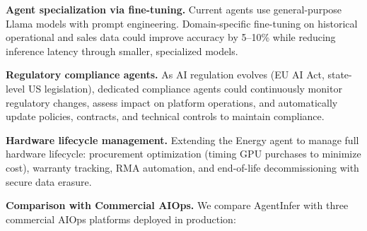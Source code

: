 \documentclass[conference,10pt,letterpaper]{IEEEtran}
\begin{document}
\textbf{Agent specialization via fine-tuning.} Current agents use general-purpose Llama models with prompt engineering. Domain-specific fine-tuning on historical operational and sales data could improve accuracy by 5--10\% while reducing inference latency through smaller, specialized models.

\textbf{Regulatory compliance agents.} As AI regulation evolves (EU AI Act, state-level US legislation), dedicated compliance agents could continuously monitor regulatory changes, assess impact on platform operations, and automatically update policies, contracts, and technical controls to maintain compliance.

\textbf{Hardware lifecycle management.} Extending the Energy agent to manage full hardware lifecycle: procurement optimization (timing GPU purchases to minimize cost), warranty tracking, RMA automation, and end-of-life decommissioning with secure data erasure.



\textbf{Comparison with Commercial AIOps.} We compare AgentInfer with three commercial AIOps platforms deployed in production:

\begin{table}[!t]
\caption{AgentInfer vs.\ Commercial AIOps Platforms}
\label{tab:commercial}
\centering\scriptsize
{}
\end{table}
\end{document}
